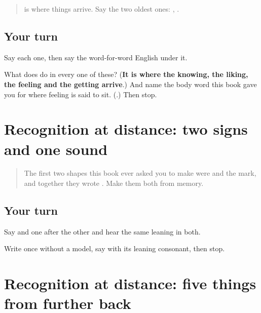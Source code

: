 \label{lesson:MR-R25-dative-frame}



\begin{quote}
\textbf{} is where things arrive. Say the two oldest ones: \textbf{  }, \textbf{  }.
\end{quote}

\subsection*{Your turn}
Say each one, then say the word-for-word English under it.

\begin{tcolorbox}[breakable,colback=teal!4,colframe=teal!35!black,title={Before you move on}]
What does \textbf{} do in every one of these? (\textbf{It is where the knowing, the liking, the feeling and the getting arrive}.) And name the body word this book gave you for where feeling is said to sit. (\textbf{}.) Then stop.
\end{tcolorbox}
\section[ha / o / chā]{Recognition at distance: two signs and one sound}

\label{lesson:MR-R25-recognition-script}



\begin{quote}
The first two shapes this book ever asked you to make were \textbf{} and the \textbf{} mark, and together they wrote \textbf{}. Make them both from memory.
\end{quote}

\subsection*{Your turn}
Say \textbf{} and \textbf{} one after the other and hear the same leaning in both.

\begin{tcolorbox}[breakable,colback=teal!4,colframe=teal!35!black,title={Before you move on}]
Write \textbf{} once without a model, say \textbf{} with its leaning consonant, then stop.
\end{tcolorbox}
\section[āhe / mitra / kuṭumb / samajṇe]{Recognition at distance: five things from further back}

